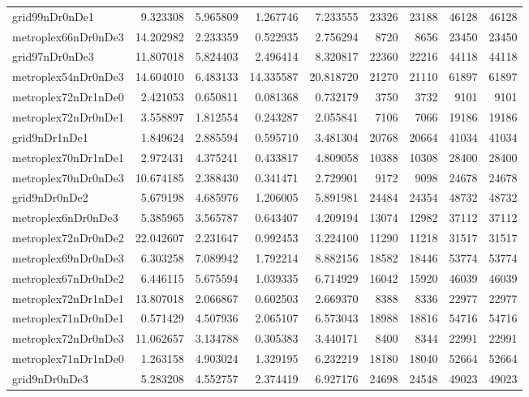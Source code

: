 \begin{longtable}{|l|r|r|r|r|r|r|r|r|}
grid99nDr0nDe1 & 9.323308 & 5.965809 & 1.267746 & 7.233555 & 23326 & 23188 & 46128 & 46128 \\
metroplex66nDr0nDe3 & 14.202982 & 2.233359 & 0.522935 & 2.756294 & 8720 & 8656 & 23450 & 23450 \\
grid97nDr0nDe3 & 11.807018 & 5.824403 & 2.496414 & 8.320817 & 22360 & 22216 & 44118 & 44118 \\
metroplex54nDr0nDe3 & 14.604010 & 6.483133 & 14.335587 & 20.818720 & 21270 & 21110 & 61897 & 61897 \\
metroplex72nDr1nDe0 & 2.421053 & 0.650811 & 0.081368 & 0.732179 & 3750 & 3732 & 9101 & 9101 \\
metroplex72nDr0nDe1 & 3.558897 & 1.812554 & 0.243287 & 2.055841 & 7106 & 7066 & 19186 & 19186 \\
grid9nDr1nDe1 & 1.849624 & 2.885594 & 0.595710 & 3.481304 & 20768 & 20664 & 41034 & 41034 \\
metroplex70nDr1nDe1 & 2.972431 & 4.375241 & 0.433817 & 4.809058 & 10388 & 10308 & 28400 & 28400 \\
metroplex70nDr0nDe3 & 10.674185 & 2.388430 & 0.341471 & 2.729901 & 9172 & 9098 & 24678 & 24678 \\
grid9nDr0nDe2 & 5.679198 & 4.685976 & 1.206005 & 5.891981 & 24484 & 24354 & 48732 & 48732 \\
metroplex6nDr0nDe3 & 5.385965 & 3.565787 & 0.643407 & 4.209194 & 13074 & 12982 & 37112 & 37112 \\
metroplex72nDr0nDe2 & 22.042607 & 2.231647 & 0.992453 & 3.224100 & 11290 & 11218 & 31517 & 31517 \\
metroplex69nDr0nDe3 & 6.303258 & 7.089942 & 1.792214 & 8.882156 & 18582 & 18446 & 53774 & 53774 \\
metroplex67nDr0nDe2 & 6.446115 & 5.675594 & 1.039335 & 6.714929 & 16042 & 15920 & 46039 & 46039 \\
metroplex72nDr1nDe1 & 13.807018 & 2.066867 & 0.602503 & 2.669370 & 8388 & 8336 & 22977 & 22977 \\
metroplex71nDr0nDe1 & 0.571429 & 4.507936 & 2.065107 & 6.573043 & 18988 & 18816 & 54716 & 54716 \\
metroplex72nDr0nDe3 & 11.062657 & 3.134788 & 0.305383 & 3.440171 & 8400 & 8344 & 22991 & 22991 \\
metroplex71nDr1nDe0 & 1.263158 & 4.903024 & 1.329195 & 6.232219 & 18180 & 18040 & 52664 & 52664 \\
grid9nDr0nDe3 & 5.283208 & 4.552757 & 2.374419 & 6.927176 & 24698 & 24548 & 49023 & 49023 \\

\end{longtable}
